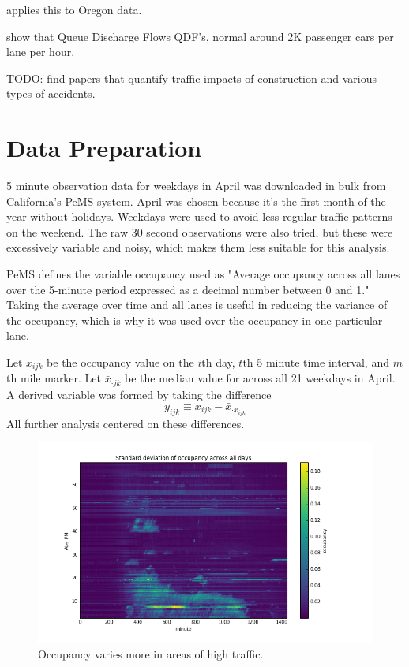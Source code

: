 \documentclass[12pt]{article}
\begin{document}
\cite{wieczorek2010techniques} applies this to Oregon data.

\cite{zhang2004some} show that Queue Discharge Flows QDF's, normal around 2K
passenger cars per lane per hour.

TODO: find papers that quantify traffic impacts of construction and various
types of accidents.

\section{Data Preparation}

5 minute observation data for weekdays in April was downloaded in bulk from California's PeMS
system. April was chosen because it's the first month of the year without
holidays. Weekdays were used to avoid less regular traffic patterns on the
weekend.
The raw 30 second observations were also tried, but these were
excessively variable and noisy, which makes them less suitable for this
analysis.

PeMS defines the variable occupancy used as "Average occupancy across all lanes over
the 5-minute period expressed as a decimal number between 0 and 1." Taking
the average over time and all lanes is useful in reducing the variance of
the occupancy, which is why it was used over the occupancy in one
particular lane.

Let $x_{ijk}$ be the occupancy value on the $i$th day, $t$th 5 minute time
interval, and $m$th mile marker. Let $\bar{x}_{\cdot jk}$ be the median
value for across all 21 weekdays in April. 
A derived variable was formed by taking the difference
\begin{equation}
    \label{eq:diff}
    y_{ijk} \equiv x_{ijk} - \bar{x}_{\cdot x_{ijk}}
\end{equation}
All further analysis centered on these differences.

\begin{figure}
    \label{fig:occ_sd}
    \centering
    \includegraphics[scale=0.5]{../occ_sd.png}
    \caption{Occupancy varies more in areas of high traffic.}
\end{figure}
\end{document}
